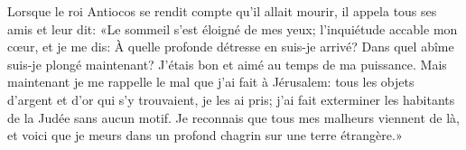 Lorsque le roi Antiocos se rendit compte qu’il allait mourir,
	il appela tous ses amis et leur dit:
	«Le sommeil s’est éloigné de mes yeux; l’inquiétude accable mon cœur,
	et je me dis: À quelle profonde détresse en suis-je arrivé?
	Dans quel abîme suis-je plongé maintenant?
	J’étais bon et aimé au temps de ma puissance.
Mais maintenant je me rappelle le mal que j’ai fait à Jérusalem:
	tous les objets d’argent et d’or qui s’y trouvaient, je les ai pris;
	j’ai fait exterminer les habitants de la Judée sans aucun motif.
Je reconnais que tous mes malheurs viennent de là,
	et voici que je meurs dans un profond chagrin sur une terre étrangère.»
